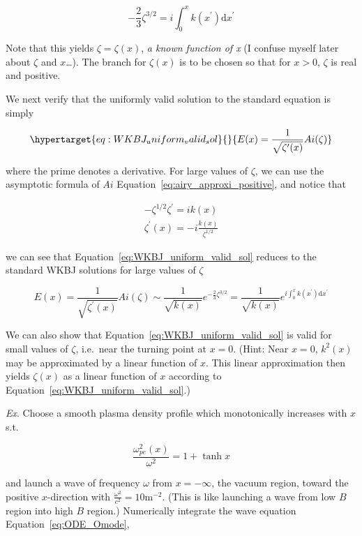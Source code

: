\documentclass[
  notoc %
]{tufte-book}
\begin{document}
\[
-\frac{2}{3}\zeta^{3/2} = i \int_0^x k(x^\prime)\mathrm{d}x^\prime
\]

Note that this yields \(\zeta=\zeta(x)\), \emph{a known function of x}
(I confuse myself later about \(\zeta\) and \(x\)\ldots). The branch for
\(\zeta(x)\) is to be chosen so that for \(x>0\), \(\zeta\) is real and
positive.

We next verify that the uniformly valid solution to the standard
equation is simply

\begin{equation}\protect\hypertarget{eq:WKBJ_uniform_valid_sol}{}{
E(x) = \frac{1}{\sqrt{\zeta^\prime(x)}}Ai(\zeta)
}\label{eq:WKBJ_uniform_valid_sol}\end{equation}

where the prime denotes a derivative. For large values of \(\zeta\), we
can use the asymptotic formula of \(Ai\)
Equation~\ref{eq:airy_approxi_positive}, and notice that

\[
\begin{aligned}
-\zeta^{1/2}\zeta^\prime = ik(x) \\
\zeta^\prime(x) = -i \frac{k(x)}{\zeta^{1/2}}
\end{aligned}
\]

we can see that Equation~\ref{eq:WKBJ_uniform_valid_sol} reduces to the
standard WKBJ solutions for large values of \(\zeta\)

\[
E(x)= \frac{1}{\sqrt{\zeta^\prime(x)}}Ai(\zeta) \sim \frac{1}{\sqrt{k(x)}} e^{-\frac{2}{3}\zeta^{3/2}} = \frac{1}{\sqrt{k(x)}}e^{ i \int_0^x k(x^\prime)\mathrm{d}x^\prime}
\]

We can also show that Equation~\ref{eq:WKBJ_uniform_valid_sol} is valid
for small values of \(\zeta\), i.e.~near the turning point at \(x=0\).
(Hint: Near \(x=0\), \(k^2(x)\) may be approximated by a linear function
of \(x\). This linear approximation then yields \(\zeta(x)\) as a linear
function of \(x\) according to
Equation~\ref{eq:WKBJ_uniform_valid_sol}.)

\emph{Ex}. Choose a smooth plasma density profile which monotonically
increases with \(x\) s.t.

\[
\frac{\omega_{pe}^2(x)}{\omega^2} = 1 + \tanh{x}
\]

and launch a wave of frequency \(\omega\) from \(x=-\infty\), the vacuum
region, toward the positive \(x\)-direction with
\(\frac{\omega^2}{c^2} = 10 \text{m}^{-2}\). (This is like launching a
wave from low \(B\) region into high \(B\) region.) Numerically
integrate the wave equation Equation~\ref{eq:ODE_Omode},
\end{document}
